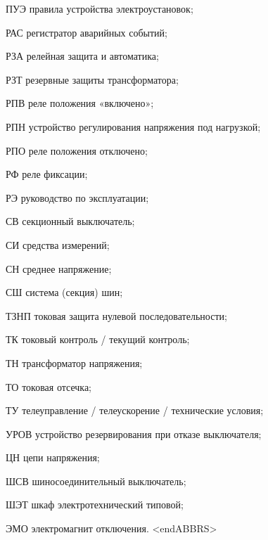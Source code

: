 \begin{list}{}
\item[ПУЭ] правила устройства электроустановок;
\item[РАС] регистратор аварийных событий;
\item[РЗА] релейная защита и автоматика;
\item[РЗТ] резервные защиты трансформатора;
\item[РПВ] реле положения «включено»;
\item[РПН] устройство регулирования напряжения под нагрузкой;
\item[РПО] реле положения отключено;
\item[РФ] реле фиксации;
\item[РЭ] руководство по эксплуатации;
\item[СВ] секционный выключатель;
\item[СИ] средства измерений;
\item[СН] среднее напряжение;
\item[СШ] система (секция) шин;
\item[ТЗНП] токовая защита нулевой последовательности;
\item[ТК] токовый контроль / текущий контроль;
\item[ТН] трансформатор напряжения;
\item[ТО] токовая отсечка;
\item[ТУ] телеуправление / телеускорение / технические условия;
\item[УРОВ] устройство резервирования при отказе выключателя;
\item[ЦН] цепи напряжения;
\item[ШСВ] шиносоединительный выключатель;
\item[ШЭТ] шкаф электротехнический типовой;
\item[ЭМО] электромагнит отключения.
{\color{white}\fontsize{0.1pt}{0.1pt}\selectfont<endABBRS>}
\end{list}
